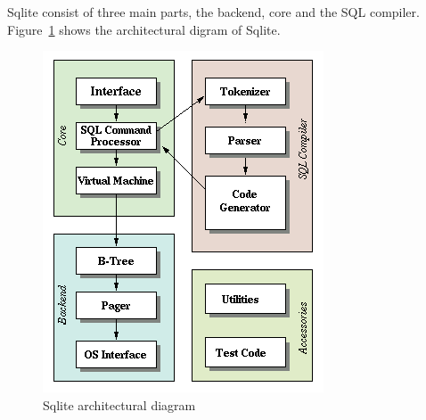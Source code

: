 Sqlite consist of three main parts, the backend, core and the SQL compiler. Figure~\ref{fig:sqlite_arch} shows the architectural digram of Sqlite.

\begin{figure}[H]
	\centering
	\includegraphics[scale=0.5]{images/sqlite_arch.png}
	\caption{Sqlite architectural diagram \citep{sqlite}}
	\label{fig:sqlite_arch}
\end{figure}

